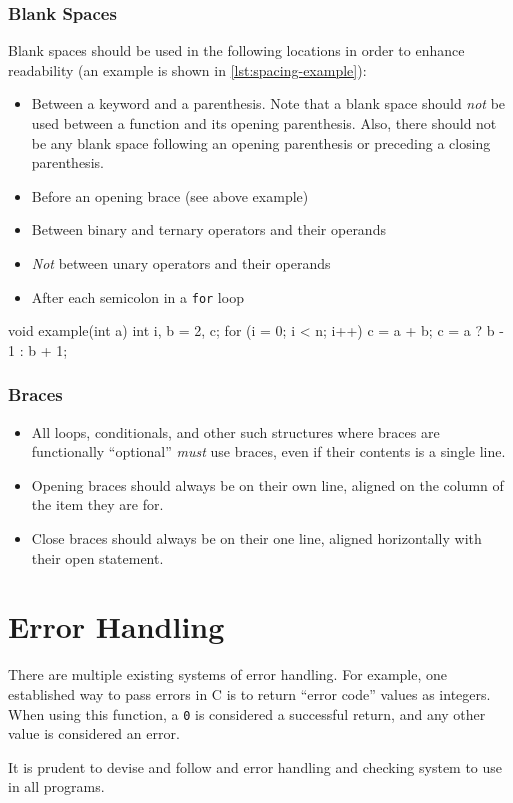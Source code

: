 \documentclass[11pt]{book}
\begin{document}
\subsection{Blank Spaces}\label{blank-spaces}

Blank spaces should be used in the following locations in order to enhance
readability (an example is shown in \autoref{lst:spacing-example}):

\begin{itemize}
\item
  Between a keyword and a parenthesis. Note that a blank space should
  \emph{not} be used between a function and its opening parenthesis. Also,
  there should not be any blank space following an opening parenthesis
  or preceding a closing parenthesis.
\item
  Before an opening brace (see above example)
\item
  Between binary and ternary operators and their operands
\item
  \emph{Not} between unary operators and their operands
\item
  After each semicolon in a \texttt{for} loop
\end{itemize}

\begin{code}[caption=Spacing example, label=lst:spacing-example]
void example(int a) {
	int i, b = 2, c;
	for (i = 0; i < n; i++) {
		c = a + b;
		c = a ? b - 1 : b + 1;
	}
}
\end{code}

\subsection{Braces}\label{braces}

\begin{itemize}
\item
  All loops, conditionals, and other such structures where braces are
  functionally ``optional'' \emph{must} use braces, even if their
  contents is a single line.
\item
  Opening braces should always be on their own line, aligned on the
  column of the item they are for.
\item
  Close braces should always be on their one line, aligned horizontally
  with their open statement.
\end{itemize}

\chapter{Error Handling}\label{error-handling}

There are multiple existing systems of error handling. For example, one
established way to pass errors in C is to return ``error code'' values
as integers. When using this function, a \texttt{0} is considered a successful
return, and any other value is considered an error.

It is prudent to devise and follow and error handling and checking
system to use in all programs.
\end{document}
